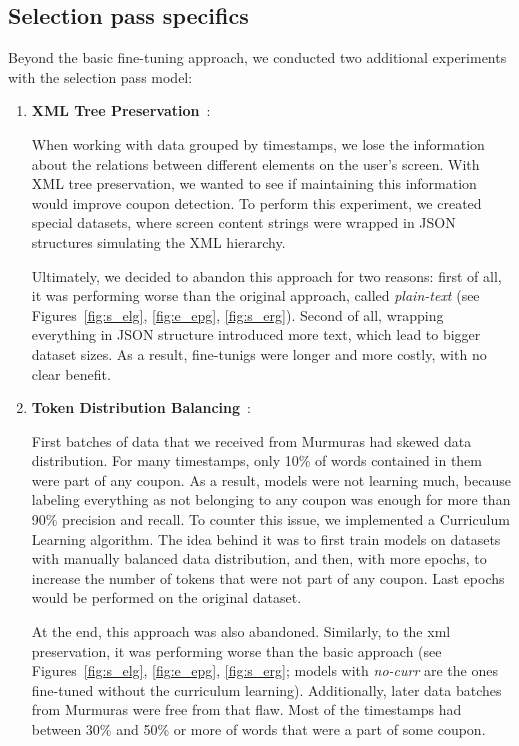 \documentclass[licencjacka,en]{pracamgr}
\begin{document}
\subsection{Selection pass specifics}
Beyond the basic fine-tuning approach, we conducted two additional experiments with the selection pass model:

\begin{enumerate}
    \item \textbf{XML Tree Preservation}~\cite{JSON_code}:

    When working with data grouped by timestamps, we lose the information about the relations between different elements on the user's screen. With XML tree preservation, we wanted to see if maintaining this information would improve coupon detection. To perform this experiment, we created special datasets, where screen content strings were wrapped in JSON structures simulating the XML hierarchy.

    Ultimately, we decided to abandon this approach for two reasons: first of all, it was performing worse than the original approach, called \emph{plain-text} (see Figures~\ref{fig:s_elg}, \ref{fig:e_epg}, \ref{fig:s_erg}). Second of all, wrapping everything in JSON structure introduced more text, which lead to bigger dataset sizes. As a result, fine-tunigs were longer and more costly, with no clear benefit.

    \item \textbf{Token Distribution Balancing}~\cite{Curriculer}:

    First batches of data that we received from Murmuras had skewed data distribution. For many timestamps, only 10\% of words contained in them were part of any coupon. As a result, models were not learning much, because labeling everything as not belonging to any coupon was enough for more than 90\% precision and recall. To counter this issue, we implemented a Curriculum Learning algorithm. The idea behind it was to first train models on datasets with manually balanced data distribution, and then, with more epochs, to increase the number of tokens that were not part of any coupon. Last epochs would be performed on the original dataset.

    At the end, this approach was also abandoned. Similarly, to the xml preservation, it was performing worse than the basic approach (see Figures~\ref{fig:s_elg}, \ref{fig:e_epg}, \ref{fig:s_erg}; models with \emph{no-curr} are the ones fine-tuned without the curriculum learning). Additionally, later data batches from Murmuras were free from that flaw. Most of the timestamps had between 30\% and 50\% or more of words that were a part of some coupon.
\end{enumerate}
\end{document}
